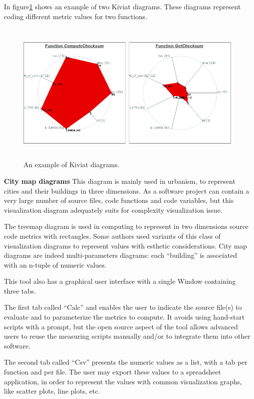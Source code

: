 In figure\ref{fig:metrix} shows an example of two Kiviat diagrams. These diagrams represent coding different metric values for two functions. 

\begin{figure}[h]
	\centering
	\includegraphics[height=70mm]{figures/metrix.png}
	\caption{An example of Kiviat diagrams.}
	\label{fig:metrix}
\end{figure}

\textbf{City map diagrams}
This diagram is mainly used in urbanism, to represent cities and their buildings in three dimensions. As a software project  can contain a very large number of source files, code functions  and code variables, but this visualization diagram adequately suits for complexity visualization issue. 

The treemap diagram is used in computing to represent in two dimensions source code metrics with rectangles. Some authors used variants of this class of visualization diagrams to represent  values with esthetic considerations. City map diagrams are indeed multi-parameters diagrams: each “building” is associated with an n-tuple of numeric values.  

This tool also has a graphical user interface with a single Window containing three tabs.

The first tab called “Calc” and enables the user to indicate the source file(s) to evaluate and to parameterize the metrics to compute. It avoids using hand-start scripts with a prompt, but the open source aspect of the tool allows advanced users to reuse the measuring scripts manually and/or to integrate them into other software.

The second tab called “Csv” presents the numeric values as a list, with a tab per function and per file. The user may export these values to a spreadsheet application, in order to represent  the values with common visualization graphs, like scatter plots, line plots, etc.

